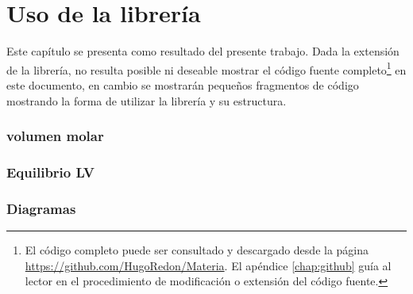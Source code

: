 \chapter{Uso de la librería}
	
	Este capítulo se presenta como resultado del presente trabajo. Dada la extensión de la librería, no resulta posible ni deseable mostrar el código fuente completo\footnote{El código completo puede ser consultado y descargado desde la página \url{https://github.com/HugoRedon/Materia}. El apéndice \ref{chap:github} guía al lector en el procedimiento de modificación o extensión del código fuente.} en este documento, en cambio se mostrarán pequeños fragmentos de código mostrando la forma de utilizar la librería y su estructura.
		

			

		
		
		
		
		
		
		
		
		\subsection{volumen molar}
		\subsection{Equilibrio LV}
		
		
		
		
		
		\subsection{Diagramas}
	

